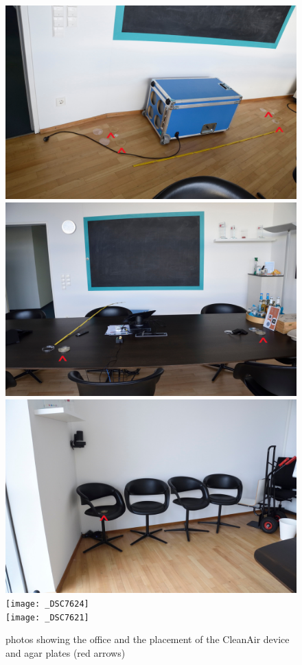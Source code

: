 \documentclass[hyperref]{labbook}
\begin{document}
\begin{figure}[h!]
\includegraphics[scale=0.05]{_DSC7617}\hfill
\includegraphics[scale=0.05]{_DSC7622}\\
\includegraphics[scale=0.05]{_DSC7623}\hfill
\texttt{[image: \_DSC7624]}\\
\texttt{[image: \_DSC7621]}\\
\caption{photos showing the office and the placement of the CleanAir device and agar plates (red arrows)}
\end{figure}
\end{document}
